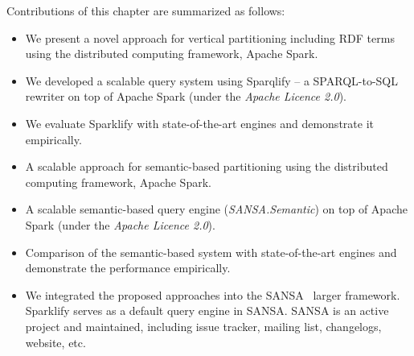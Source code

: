 Contributions of this chapter are summarized as follows:

\begin{itemize}
 \item We present a novel approach for vertical partitioning including \gls{RDF} terms using the distributed computing framework, Apache Spark.
 \item We developed a scalable query system using Sparqlify -- a SPARQL-to-SQL rewriter on top of Apache Spark (under the \textit{Apache Licence 2.0}).
 \item We evaluate Sparklify with state-of-the-art engines and demonstrate it empirically.
 \item A scalable approach for semantic-based partitioning using the distributed computing framework, Apache Spark.
 \item A scalable semantic-based query engine (\textit{SANSA.Semantic}) on top of Apache Spark (under the \textit{Apache Licence 2.0}).
 \item Comparison of the semantic-based system with state-of-the-art engines and demonstrate the performance empirically.
 \item We integrated the proposed approaches into the SANSA~\cite{lehmann-2017-sansa-iswc} larger framework.
 Sparklify serves as a default query engine in SANSA.
 SANSA is an active project and maintained, including issue tracker, mailing list, changelogs, website, etc.
\end{itemize}


